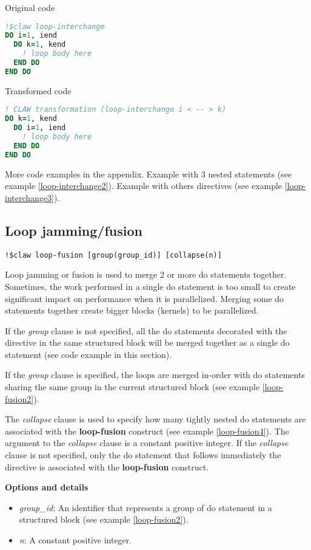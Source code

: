 Original code
\begin{lstlisting}[language=Fortran]
!$claw loop-interchange
DO i=1, iend
  DO k=1, kend
    ! loop body here
  END DO
END DO
\end{lstlisting}

Transformed code
\begin{lstlisting}[language=Fortran]
! CLAW transformation (loop-interchange i < -- > k)
DO k=1, kend
  DO i=1, iend
    ! loop body here
  END DO
END DO
\end{lstlisting}

More code examples in the appendix. Example with 3 nested statements (see example \ref{loop-interchange2}). Example with others directives (see example \ref{loop-interchange3}).

\subsection{Loop jamming/fusion}
\begin{lstlisting}
!$claw loop-fusion [group(group_id)] [collapse(n)]
\end{lstlisting}

Loop jamming or fusion is used to merge 2 or more do statements together. Sometimes, the
work performed in a single do statement is too small to create significant impact on
performance when it is parallelized. Merging some do statements together create bigger
blocks (kernels) to be parallelized.

If the \textit{group} clause is not specified, all the do statements decorated with the directive in the
same structured block will be merged together as a single do statement (see code example in this section).

If the \textit{group} clause is specified, the loops are merged in-order with do statements sharing
the same group in the current structured block (see example \ref{loop-fusion2}).

The \textit{collapse} clause is used to specify how many tightly nested do statements are
associated with the \textbf{loop-fusion} construct (see example \ref{loop-fusion4}). The argument to the \textit{collapse}
clause is a constant positive integer. If the \textit{collapse} clause
is not specified, only the do statement that follows immediately the directive is associated with the \textbf{loop-fusion} construct.

\textbf{Options and details}
\begin{itemize}
\item \textit{group\_id}: An identifier that represents a group of do statement in a structured block (see example \ref{loop-fusion2}).
\item \textit{n}: A constant positive integer.
\end{itemize}

